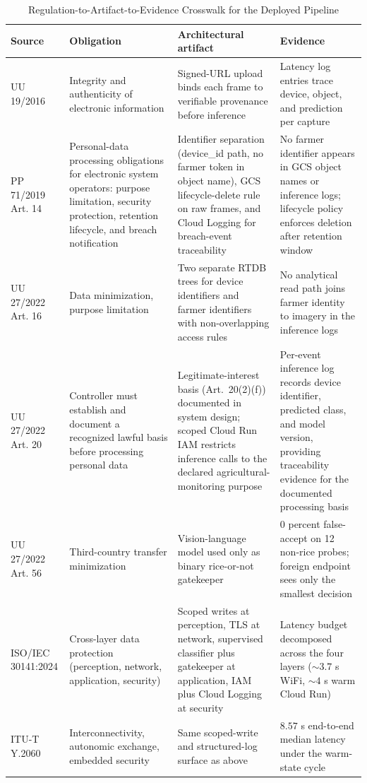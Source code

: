 \begin{table}[H]
\centering
\caption{Regulation-to-Artifact-to-Evidence Crosswalk for the Deployed Pipeline}
\label{tab:gov-crosswalk}
\scriptsize
\renewcommand{\arraystretch}{1.2}
\setlength{\tabcolsep}{3pt}
\begin{tabularx}{\linewidth}{|>{\raggedright\arraybackslash}p{2.6cm}|>{\raggedright\arraybackslash}X|>{\raggedright\arraybackslash}X|>{\raggedright\arraybackslash}X|}
\hline
\textbf{Source} & \textbf{Obligation} & \textbf{Architectural artifact} & \textbf{Evidence} \\
\hline
UU 19/2016 & Integrity and authenticity of electronic information & Signed-URL upload binds each frame to verifiable provenance before inference & Latency log entries trace device, object, and prediction per capture \\
\hline
PP 71/2019 Art. 14 & Personal-data processing obligations for electronic system operators: purpose limitation, security protection, retention lifecycle, and breach notification & Identifier separation (device\_id path, no farmer token in object name), GCS lifecycle-delete rule on raw frames, and Cloud Logging for breach-event traceability & No farmer identifier appears in GCS object names or inference logs; lifecycle policy enforces deletion after retention window \\
\hline
UU 27/2022 Art. 16 & Data minimization, purpose limitation & Two separate RTDB trees for device identifiers and farmer identifiers with non-overlapping access rules & No analytical read path joins farmer identity to imagery in the inference logs \\
\hline
UU 27/2022 Art. 20 & Controller must establish and document a recognized lawful basis before processing personal data & Legitimate-interest basis (Art.~20(2)(f)) documented in system design; scoped Cloud Run IAM restricts inference calls to the declared agricultural-monitoring purpose & Per-event inference log records device identifier, predicted class, and model version, providing traceability evidence for the documented processing basis \\
\hline
UU 27/2022 Art. 56 & Third-country transfer minimization & Vision-language model used only as binary rice-or-not gatekeeper & $0$ percent false-accept on 12 non-rice probes; foreign endpoint sees only the smallest decision \\
\hline
ISO/IEC 30141:2024 & Cross-layer data protection (perception, network, application, security) & Scoped writes at perception, TLS at network, supervised classifier plus gatekeeper at application, IAM plus Cloud Logging at security & Latency budget decomposed across the four layers ($\sim$$3.7$ s WiFi, $\sim$$4$ s warm Cloud Run) \\
\hline
ITU-T Y.2060 & Interconnectivity, autonomic exchange, embedded security & Same scoped-write and structured-log surface as above & $8.57$ s end-to-end median latency under the warm-state cycle \\
\hline
\end{tabularx}
\end{table}

